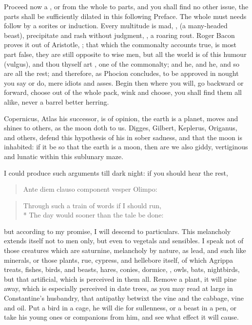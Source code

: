 Proceed now a , or from the whole to parts, and you
shall find no other issue, the parts shall be sufficiently dilated in
this following Preface. The whole must needs follow by a sorites or
induction. Every multitude is mad, , (a
many-headed beast), precipitate and rash without judgment, , a roaring rout. Roger Bacon proves it out of Aristotle,
; that which the commonalty accounts true, is most part
false, they are still opposite to wise men, but all the world is of
this humour (vulgus), and thou thyself art , one of the
commonalty; and he, and he, and so are all the rest; and therefore, as
Phocion concludes, to be approved in nought you say or do, mere idiots
and asses. Begin then where you will, go backward or forward, choose
out of the whole pack, wink and choose, you shall find them all alike,
never a barrel better herring.

Copernicus, Atlas his successor, is of opinion, the earth is a planet,
moves and shines to others, as the moon doth to us. Digges, Gilbert,
Keplerus, Origanus, and others, defend this hypothesis of his in sober
sadness, and that the moon is inhabited: if it be so that the earth is
a moon, then are we also giddy, vertiginous and lunatic within this
sublunary maze.

I could produce such arguments till dark night: if you should hear the
rest,
%
\begin{latin}
\begin{verse}
Ante diem clauso component vesper Olimpo:
\end{verse}
\end{latin}
\translationrule%
\begin{verse}
Through such a train of words if I should run,\\*
The day would sooner than the tale be done:
\end{verse}

but according to my promise, I will descend to particulars. This
melancholy extends itself not to men only, but even to vegetals and
sensibles. I speak not of those creatures which are saturnine,
melancholy by nature, as lead, and such like minerals, or those plants,
rue, cypress, \etc{} and hellebore itself, of which Agrippa treats,
fishes, birds, and beasts, hares, conies, dormice, \etc{}, owls, bats,
nightbirds, but that artificial, which is perceived in them all. Remove
a plant, it will pine away, which is especially perceived in date
trees, as you may read at large in Constantine's husbandry, that
antipathy betwixt the vine and the cabbage, vine and oil. Put a bird in
a cage, he will die for sullenness, or a beast in a pen, or take his
young ones or companions from him, and see what effect it will cause.

